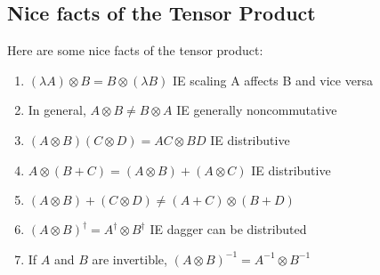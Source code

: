 \documentclass[12pt]{article}
\theoremstyle{plain}
\theoremstyle{nonumberplain}
\theoremstyle{plain}
\theoremstyle{nonumberplain}
\newcommand\1{{\bf 1}}
\newcommand{\<}{\left\langle}
\renewcommand{\>}{\right\rangle}
\begin{document}

\subsection{Nice facts of the Tensor Product}
Here are some nice facts of the tensor product:
\begin{enumerate}
\item $(\lambda A)\otimes B=B \otimes (\lambda B)$ IE scaling A affects B and vice versa
\item In general, $A\otimes B\neq B\otimes A$ IE generally noncommutative
\item $(A\otimes B)(C \otimes D)=AC\otimes BD$ IE distributive
\item $A\otimes (B+C)=(A\otimes B)+(A\otimes C)$ IE distributive
\item $(A\otimes B)+(C\otimes D)\neq (A + C)\otimes (B + D)$
\item $(A\otimes B)^\dagger=A^\dagger \otimes B^\dagger$ IE dagger can be distributed
\item If $A$ and $B$ are invertible, $(A\otimes B)^{-1}=A^{-1} \otimes B^{-1}$
\end{enumerate}
\end{document}
